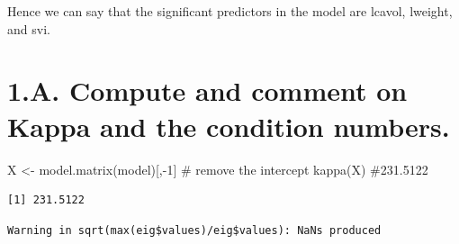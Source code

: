 \documentclass[
  letterpaper,
  DIV=11,
  numbers=noendperiod]{scrartcl}
\newenvironment{Shaded}{\begin{snugshade}}{\end{snugshade}}
\newcommand{\AttributeTok}[1]{\textcolor[rgb]{0.40,0.45,0.13}{#1}}
\newcommand{\CommentTok}[1]{\textcolor[rgb]{0.37,0.37,0.37}{#1}}
\newcommand{\ConstantTok}[1]{\textcolor[rgb]{0.56,0.35,0.01}{#1}}
\newcommand{\DecValTok}[1]{\textcolor[rgb]{0.68,0.00,0.00}{#1}}
\newcommand{\FunctionTok}[1]{\textcolor[rgb]{0.28,0.35,0.67}{#1}}
\newcommand{\NormalTok}[1]{\textcolor[rgb]{0.00,0.23,0.31}{#1}}
\newcommand{\OtherTok}[1]{\textcolor[rgb]{0.00,0.23,0.31}{#1}}
\newcommand{\SpecialCharTok}[1]{\textcolor[rgb]{0.37,0.37,0.37}{#1}}
\begin{document}
Hence we can say that the significant predictors in the model are
lcavol, lweight, and svi.

\hypertarget{a.-compute-and-comment-on-kappa-and-the-condition-numbers.}{%
\section{1.A. Compute and comment on Kappa and the condition
numbers.}\label{a.-compute-and-comment-on-kappa-and-the-condition-numbers.}}

\begin{Shaded}
\begin{Highlighting}[]
\NormalTok{X }\OtherTok{\textless{}{-}} \FunctionTok{model.matrix}\NormalTok{(model)[,}\SpecialCharTok{{-}}\DecValTok{1}\NormalTok{]  }\CommentTok{\# remove the intercept}
\FunctionTok{kappa}\NormalTok{(X) }\CommentTok{\#231.5122}
\end{Highlighting}
\end{Shaded}

\begin{verbatim}
[1] 231.5122
\end{verbatim}

\begin{Shaded}
\end{Shaded}

\begin{verbatim}
Warning in sqrt(max(eig$values)/eig$values): NaNs produced
\end{verbatim}
\end{document}
